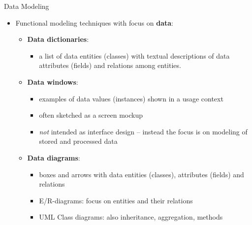 \begin{Slide}{Data Modeling }
\begin{itemize}
\item Functional modeling techniques with focus on \textbf{data}:
\begin{itemize}
\item \textbf{Data dictionaries}: 
\begin{itemize}
\item a list of data entities (classes) with textual descriptions of data attributes (fields) and relations among entities.
\end{itemize}
\item \textbf{Data windows}: 
\begin{itemize}
\item examples of data values (instances) shown in a usage context
\item often sketched as a screen mockup
\item \textit{not} intended as interface design -- instead the focus is on modeling of stored and processed data 
\end{itemize}
\item \textbf{Data diagrams}: 
\begin{itemize}
\item boxes and arrows with data entities (classes), attributes (fields) and relations
\item E/R-diagrams: focus on entities and their relations 
\item UML Class diagrams: also inheritance, aggregation, methods

\end{itemize}
\end{itemize}
\end{itemize}
\end{Slide}
